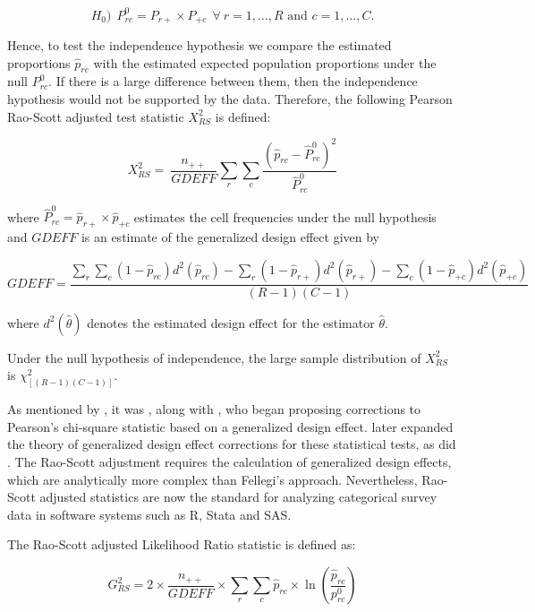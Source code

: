 \documentclass[
  12pt,
]{book}
\begin{document}
\[
H_0) \ \ P_{rc}^0 = {P_{r+} \times P_{+c}} \ \ \forall \ r=1, \ldots, R \text{ and } c=1, \ldots, C.
\]

Hence, to test the independence hypothesis we compare the estimated proportions \(\widehat{p}_{rc}\) with the estimated expected population proportions under the null \(P_{rc}^0\). If there is a large difference between them, then the independence hypothesis would not be supported by the data. Therefore, the following Pearson Rao-Scott adjusted test statistic \(X_{RS}^2\) \citep{Rao1984} is defined:

\[
X_{RS}^2 =\ \frac {n_{++}} {GDEFF} \sum_r \sum_c \frac{\left(\widehat{p}_{rc} - \widehat P_{rc}^0 \right)^2}{\widehat P_{rc}^0}
\]

where \(\widehat P_{rc}^0 = \widehat p_{r+} \times \widehat p_{+c}\) estimates the cell frequencies under the null hypothesis and \(GDEFF\) is an estimate of the generalized design effect given by

\[
GDEFF = \frac{\sum_{r}\sum_{c}\left(1 - \widehat p_{rc}\right) d^{2}\left(\widehat p_{rc}\right) - \sum_{r} \left(1 - \widehat p_{r+} \right) d^{2}\left(\widehat p_{r+}\right) - \sum_{c} \left( 1 - \widehat p_{+c} \right) d^{2} \left( \widehat p_{+c} \right)} {\left(R-1\right)\left(C-1\right)}
\]

where \(d^2 \left({\widehat \theta}\right)\) denotes the estimated design effect for the estimator \({\widehat \theta}\).

Under the null hypothesis of independence, the large sample distribution of \(X_{RS}^2\) is \(\chi^2_{[(R-1) (C-1)]}\).

As mentioned by \citet{Heeringa2017}, it was \citet{Fay1979}, along with \citet{Fellegi1980}, who began proposing corrections to Pearson's chi-square statistic based on a generalized design effect. \citet{Rao1984} later expanded the theory of generalized design effect corrections for these statistical tests, as did \citet{thomas1987small_sample}. The Rao-Scott adjustment requires the calculation of generalized design effects, which are analytically more complex than Fellegi's approach. Nevertheless, Rao-Scott adjusted statistics are now the standard for analyzing categorical survey data in software systems such as R, Stata and SAS.

The Rao-Scott adjusted Likelihood Ratio statistic is defined as:

\[
G_{RS}^{2} = 2 \times \frac {n_{++}} {GDEFF} \times \sum_{r} \sum_{c} \widehat p_{rc} \times \ln \left( \frac{\widehat p_{rc}}{p_{rc}^0} \right)
\]
\end{document}
